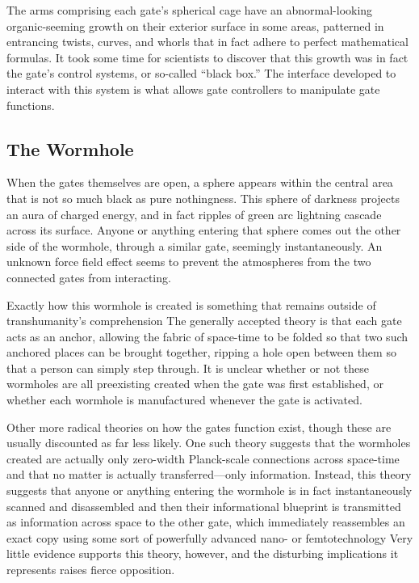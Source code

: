 The arms comprising each gate's spherical cage have an abnormal-looking organic-seeming growth on their exterior surface in some areas, patterned in entrancing twists, curves, and whorls that in fact adhere to perfect mathematical formulas. It took some time for scientists to discover that this growth was in fact the gate's control systems, or so-called ``black box.'' The interface developed to interact with this system is what allows gate controllers to manipulate gate functions. 

\subsection{The Wormhole} 

When the gates themselves are open, a sphere appears within the central area that is not so much black as pure nothingness. This sphere of darkness projects an aura of charged energy, and in fact ripples of green arc lightning cascade across its surface. Anyone or anything entering that sphere comes out the other side of the wormhole, through a similar gate, seemingly instantaneously. An unknown force field effect seems to prevent the atmospheres from the two connected gates from interacting. 

Exactly how this wormhole is created is something that remains outside of transhumanity's comprehension The generally accepted theory is that each gate acts as an anchor, allowing the fabric of space-time to be folded so that two such anchored places can be brought together, ripping a hole open between them so that a person can simply step through. It is unclear whether or not these wormholes are all preexisting created when the gate was first established, or whether each wormhole is manufactured whenever the gate is activated. 

Other more radical theories on how the gates function exist, though these are usually discounted as far less likely. One such theory suggests that the wormholes created are actually only zero-width Planck-scale connections across space-time and that no matter is actually transferred—only information. Instead, this theory suggests that anyone or anything entering the wormhole is in fact instantaneously scanned and disassembled and then their informational blueprint is transmitted as information across space to the other gate, which immediately reassembles an exact copy using some sort of powerfully advanced nano- or femtotechnology Very little evidence supports this theory, however, and the disturbing implications it represents raises fierce opposition. 

